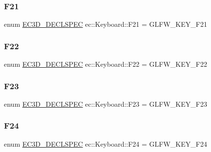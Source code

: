 \subsubsection{\texorpdfstring{F21}{F21}}
{\footnotesize\ttfamily enum \mbox{\hyperlink{_common_8h_aac42573e202ca3dd4d259c81691e2369}{E\+C3\+D\+\_\+\+D\+E\+C\+L\+S\+P\+EC}} ec\+::\+Keyboard\+::\+F21 = G\+L\+F\+W\+\_\+\+K\+E\+Y\+\_\+\+F21}

\mbox{\label{classec_1_1_keyboard_af33c09fe67e20ee71d7b37c5d05c2760}} 
\subsubsection{\texorpdfstring{F22}{F22}}
{\footnotesize\ttfamily enum \mbox{\hyperlink{_common_8h_aac42573e202ca3dd4d259c81691e2369}{E\+C3\+D\+\_\+\+D\+E\+C\+L\+S\+P\+EC}} ec\+::\+Keyboard\+::\+F22 = G\+L\+F\+W\+\_\+\+K\+E\+Y\+\_\+\+F22}

\mbox{\label{classec_1_1_keyboard_aaa559281a2c74941811c3d9abe55d973}} 
\subsubsection{\texorpdfstring{F23}{F23}}
{\footnotesize\ttfamily enum \mbox{\hyperlink{_common_8h_aac42573e202ca3dd4d259c81691e2369}{E\+C3\+D\+\_\+\+D\+E\+C\+L\+S\+P\+EC}} ec\+::\+Keyboard\+::\+F23 = G\+L\+F\+W\+\_\+\+K\+E\+Y\+\_\+\+F23}

\mbox{\label{classec_1_1_keyboard_af709a6fa5ab3d0e5069cf29f3f9861d3}} 
\subsubsection{\texorpdfstring{F24}{F24}}
{\footnotesize\ttfamily enum \mbox{\hyperlink{_common_8h_aac42573e202ca3dd4d259c81691e2369}{E\+C3\+D\+\_\+\+D\+E\+C\+L\+S\+P\+EC}} ec\+::\+Keyboard\+::\+F24 = G\+L\+F\+W\+\_\+\+K\+E\+Y\+\_\+\+F24}

\mbox{\label{classec_1_1_keyboard_a00ab8cfc0de951d98d759ddc214e2523}} 
